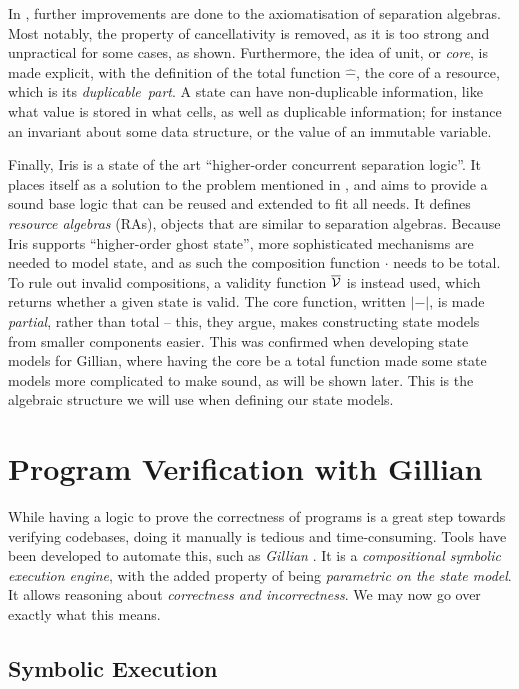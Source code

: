 In \cite{statesoundness}, further improvements are done to the axiomatisation of separation algebras. Most notably, the property of cancellativity is removed, as it is too strong and unpractical for some cases, as shown. Furthermore, the idea of unit, or \emph{core}, is made explicit, with the definition of the total function $\hat-$, the core of a resource, which is its \emph{duplicable~part}. A state can have non-duplicable information, like what value is stored in what cells, as well as duplicable information; for instance an invariant about some data structure, or the value of an immutable variable.

Finally, Iris \cite{iris1,iris2,iris3,iris} is a state of the art ``higher-order concurrent separation logic''. It places itself as a solution to the problem mentioned in \cite{next700seplogics}, and aims to provide a sound base logic that can be reused and extended to fit all needs. It defines \emph{resource algebras} (RAs), objects that are similar to separation algebras. Because Iris supports ``higher-order ghost state'', more sophisticated mechanisms are needed to model state, and as such the composition function $\cdot$ needs to be total. To rule out invalid compositions, a validity function $\overline{\cal V}$ is instead used, which returns whether a given state is valid. The core function, written $|-|$, is made \emph{partial}, rather than total -- this, they argue, makes constructing state models from smaller components easier. This was confirmed when developing state models for Gillian, where having the core be a total function made some state models more complicated to make sound, as will be shown later. This is the algebraic structure we will use when defining our state models.

\section{Program Verification with Gillian} \label{sec:gillianverif}

While having a logic to prove the correctness of programs is a great step towards verifying codebases, doing it manually is tedious and time-consuming. Tools have been developed to automate this, such as \emph{Gillian} \cite{gillian0, gillian1, gillian2}. It is a \emph{compositional symbolic execution engine}, with the added property of being \emph{parametric on the state model}. It allows reasoning about \emph{correctness and incorrectness}. We may now go over exactly what this means.

\subsection{Symbolic Execution}

